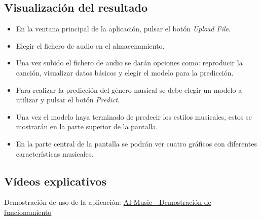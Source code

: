 

\subsection{Visualización del resultado}

\begin{itemize}
\tightlist

\item En la ventana principal de la aplicación, pulsar el botón \textit{Upload File}.
\item Elegir el fichero de audio en el almacenamiento.
\item Una vez subido el fichero de audio se darán opciones como: reproducir la canción, visualizar datos básicos y elegir el modelo para la predicción.
\item Para realizar la predicción del género musical se debe elegir un modelo a utilizar y pulsar el botón \textit{Predict}.
\item Una vez el modelo haya terminado de predecir los estilos musicales, estos se mostrarán en la parte superior de la pantalla.
\item En la parte central de la pantalla se podrán ver cuatro gráficos con diferentes características musicales.

\end{itemize}





\subsection{Vídeos explicativos}

Demostración de uso de la aplicación: \href{https://www.youtube.com/watch?v=aX596dmo6Dk}{AI-Music - Demostración de funcionamiento}